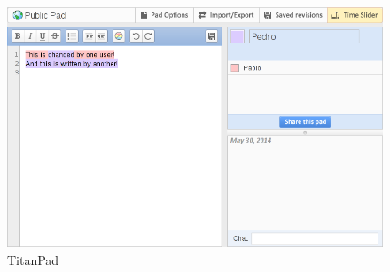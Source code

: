 \begin{figure}[h]
  \center
    \includegraphics[keepaspectratio, scale=0.4]{Media/Captures/Soa/TitanPad.png}
  \caption{TitanPad}
  \label{fig:titanpad}
\end{figure}

